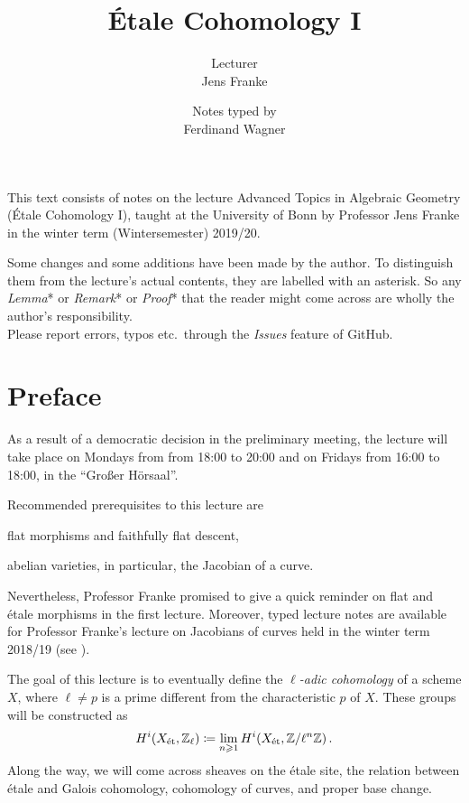 \documentclass[a4paper, 10pt, oneside, DIV=9, chapterprefix=true, numbers=enddot, bibliography=totoc]{scrbook}
\title{Étale Cohomology I}
\author{{\normalsize Lecturer}\\
	Jens Franke}
\date{{\normalsize Notes typed by}\\
	Ferdinand Wagner}
\begin{document}
\frontmatter
{}
\maketitle
\noindent This text consists of notes on the lecture Advanced Topics in Algebraic Geometry (Étale Cohomology I), taught at the University of
Bonn by Professor Jens Franke in the winter term (Wintersemester) 2019/20.

Some changes and some additions have been made by the author. To distinguish them from the lecture's actual contents, they are labelled with an asterisk. So any \emph{Lemma}* or \emph{Remark}* or \emph{Proof}* that the reader might come across are wholly the author's responsibility.\\[\thmsep]Please report errors, typos etc.\ through the \emph{Issues} feature of GitHub.


\tableofcontents
{}
\chapter{Preface}
As a result of a democratic decision in the preliminary meeting, the lecture will take place on Mondays from from 18:00 to 20:00 and on Fridays from 16:00 to 18:00, in the \enquote{Großer Hörsaal}.

Recommended prerequisites to this lecture are
\begin{temize}
	\item flat morphisms and faithfully flat descent,
	\item abelian varieties, in particular, the Jacobian of a curve.
\end{temize}
Nevertheless, Professor Franke promised to give a quick reminder on flat and étale morphisms in the first lecture. Moreover, typed lecture notes are available for Professor Franke's lecture on Jacobians of curves held in the winter term 2018/19 (see \cite{jacobians}). 

The goal of this lecture is to eventually define the \emph{$\ell$-adic cohomology} of a scheme $X$, where $\ell\neq p$ is a prime different from the characteristic $p$ of $X$. These groups will be constructed as
\begin{align*}
	H^i(X_{\mathrm{\acute{e}t}},\mathbb{Z}_\ell)\coloneqq\operatorname*{lim}_{n\geqslant 1}H^i(X_{\mathrm{\acute{e}t}},\mathbb{Z}/\ell^n\mathbb{Z})\,.
\end{align*}
Along the way, we will come across sheaves on the étale site, the relation between étale and Galois cohomology, cohomology of curves, and proper base change.
\end{document}
